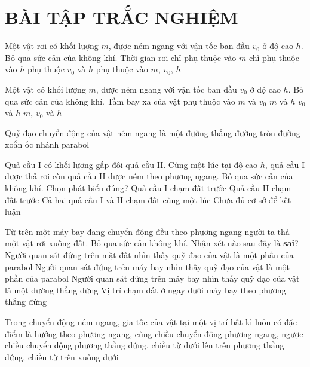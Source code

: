 \section{BÀI TẬP TRẮC NGHIỆM}
\begin{ex}
	Một vật rơi có khối lượng $m$, được ném ngang với vận tốc ban đầu $v_0$ ở độ cao $h$. Bỏ qua sức cản của không khí. Thời gian rơi	
	\choice
	{chỉ phụ thuộc vào $m$}
	{\True chỉ phụ thuộc vào $h$}
	{phụ thuộc $v_0$ và $h$}
	{phụ thuộc vào $m$, $v_0$, $h$}
	\loigiai{}
\end{ex}
\begin{ex}
	Một vật có khối lượng $m$, được ném ngang với vận tốc ban đầu $v_0$ ở độ cao $h$. Bỏ qua sức cản của không khí. Tầm bay xa của vật phụ thuộc vào
	\choice
	{$m$ và $v_0$}
	{$m$ và $h$}
	{$v_0$ và $h$}
	{$m$, $v_0$ và $h$}
	\loigiai{}
\end{ex}
\begin{ex}
	Quỹ đạo chuyển động của vật ném ngang là một 
	\choice
	{đường thẳng}
	{đường tròn}
	{đường xoắn ốc}
	{nhánh parabol}
	\loigiai{}
\end{ex}
\begin{ex}
	Quả cầu I có khối lượng  gấp đôi quả cầu II. Cùng một lúc tại độ cao $h$, quả cầu I được thả rơi còn quả cầu II được ném theo phương ngang. Bỏ qua sức cản của không khí. Chọn phát biểu đúng?
	\choice
	{Quả cầu I chạm đất trước}
	{Quả cầu II chạm đất trước}
	{Cả hai quả cầu I và II chạm đất cùng một lúc}
	{Chưa đủ cơ sở để kết luận}
	\loigiai{}
\end{ex}
\begin{ex}
	Từ trên một máy bay đang chuyển động đều theo phương ngang người ta thả một vật rơi xuống đất. Bỏ qua sức cản không khí. Nhận xét nào sau đây là \textbf{sai}?	
	\choice
	{Người quan sát đứng trên mặt đất nhìn thấy quỹ đạo của vật là một phần của parabol}
	{Người quan sát đứng trên máy bay nhìn thấy quỹ đạo của vật là một phần của parabol}
	{Người quan sát đứng trên máy bay nhìn thấy quỹ đạo của vật là một đường thẳng đứng}
	{Vị trí chạm đất ở ngay dưới máy bay theo phương thẳng đứng}
	\loigiai{}
\end{ex}
\begin{ex}
	Trong chuyển động ném ngang, gia tốc của vật tại một vị trí bất kì luôn có đặc điểm là hướng theo
	\choice
	{phương ngang, cùng chiều chuyển động}
	{phương ngang, ngược chiều chuyển động}
	{phương thẳng đứng, chiều từ dưới lên trên}
	{phương thẳng đứng, chiều từ trên xuống dưới}
	\loigiai{}
\end{ex}
